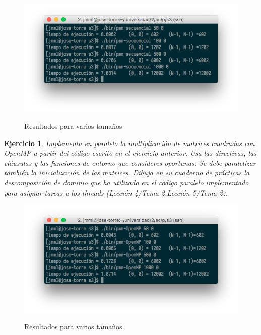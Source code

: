 \documentclass[11pt]{article}
\theoremstyle{definition-style}
\newtheorem{ejer}{Ejercicio}
\begin{document}


\begin{figure}[H]
    \centering
    \caption{Resultados para varios tamaños}
    \includegraphics[width=0.8\linewidth]{./img/81.png}
    \label{fig:}
\end{figure}

\begin{ejer}
    Implementa en paralelo la multiplicación de matrices cuadradas con OpenMP a partir del código escrito en el ejercicio anterior. Usa las directivas, las cláusulas y las funciones de entorno que consideres oportunas. Se debe paralelizar también la inicialización de las matrices. Dibuja en su cuaderno de prácticas la descomposición de dominio que ha utilizado en el código paralelo implementado para asignar tareas a los threads (Lección 4/Tema 2,Lección 5/Tema 2).
\end{ejer}




\begin{figure}[H]
    \centering
    \caption{Resultados para varios tamaños}
    \includegraphics[width=0.8\linewidth]{./img/91.png}
    \label{fig:}
\end{figure}
\end{document}
